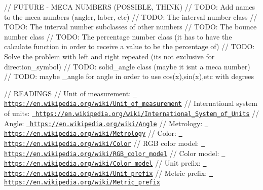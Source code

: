 // FUTURE -\/ MECA NUMBERS (POSSIBLE, THINK) // TODO\+: Add names to the meca numbers (angler, laber, etc) // TODO\+: The interval number class // TODO\+: The interval number subclasses of other numbers // TODO\+: The bounce number class // TODO\+: The percentage number class (it has to have the calculate function in order to receive a value to be the percentage of) // TODO\+: Solve the problem with left and right repeated (it\textquotesingle{}s not exclusive for direction\+\_\+symbol) // TODO\+: solid\+\_\+angle class (maybe it isn\textquotesingle{}t a meca number) // TODO\+: maybe \+\_\+angle for angle in order to use cos(x),sin(x),etc with degrees

// READINGS // Unit of measurement\+: \href{https://en.wikipedia.org/wiki/Unit_of_measurement}{\texttt{ https\+://en.\+wikipedia.\+org/wiki/\+Unit\+\_\+of\+\_\+measurement}} // International system of units\+: \href{https://en.wikipedia.org/wiki/International_System_of_Units}{\texttt{ https\+://en.\+wikipedia.\+org/wiki/\+International\+\_\+\+System\+\_\+of\+\_\+\+Units}} // Angle\+: \href{https://en.wikipedia.org/wiki/Angle}{\texttt{ https\+://en.\+wikipedia.\+org/wiki/\+Angle}} // Metrology\+: \href{https://en.wikipedia.org/wiki/Metrology}{\texttt{ https\+://en.\+wikipedia.\+org/wiki/\+Metrology}} // Color\+: \href{https://en.wikipedia.org/wiki/Color}{\texttt{ https\+://en.\+wikipedia.\+org/wiki/\+Color}} // RGB color model\+: \href{https://en.wikipedia.org/wiki/RGB_color_model}{\texttt{ https\+://en.\+wikipedia.\+org/wiki/\+RGB\+\_\+color\+\_\+model}} // Color model\+: \href{https://en.wikipedia.org/wiki/Color_model}{\texttt{ https\+://en.\+wikipedia.\+org/wiki/\+Color\+\_\+model}} // Unit prefix\+: \href{https://en.wikipedia.org/wiki/Unit_prefix}{\texttt{ https\+://en.\+wikipedia.\+org/wiki/\+Unit\+\_\+prefix}} // Metric prefix\+: \href{https://en.wikipedia.org/wiki/Metric_prefix}{\texttt{ https\+://en.\+wikipedia.\+org/wiki/\+Metric\+\_\+prefix}} 